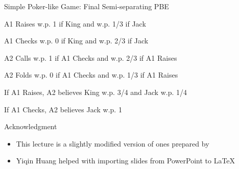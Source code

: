 \documentclass[11pt,aspectratio=169]{beamer}
\begin{document}
  
  \begin{frame}{Simple Poker-like Game: Final Semi-separating PBE}
   \begin{itemizes}
    \item A1 Raises w.p. 1 if King and w.p. 1/3 if Jack
    \item A1 Checks w.p. 0 if King and w.p. 2/3 if Jack
    \item A2 Calls w.p. 1 if A1 Checks and w.p. 2/3 if A1 Raises
    \item A2 Folds w.p. 0 if A1 Checks and w.p. 1/3 if A1 Raises
    \item If A1 Raises, A2 believes King w.p. 3/4 and Jack w.p. 1/4
    \item If A1 Checks, A2 believes Jack w.p. 1
   \end{itemizes}
  \end{frame}
  

  \begin{frame}{Acknowledgment}
   \begin{itemize}
    \setlength{\itemsep}{1em}
    \item This lecture is a slightly modified version of ones prepared by
    \item Yiqin Huang helped with importing slides from PowerPoint to \LaTeX
   \end{itemize}
  \end{frame}
  
  
\end{document}
